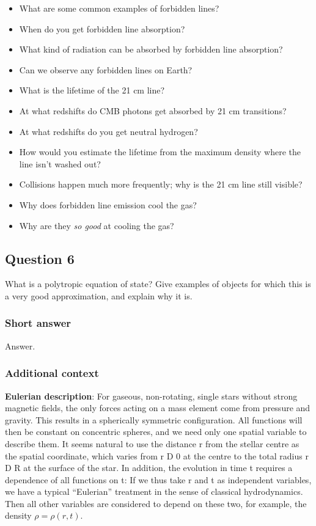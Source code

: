 \documentclass[a4paper,10pt]{article}
\begin{document}
\begin{itemize}
    \item What are some common examples of forbidden lines?
    \item When do you get forbidden line absorption?
    \item What kind of radiation can be absorbed by forbidden line absorption?
    \item Can we observe any forbidden lines on Earth?
    \item What is the lifetime of the 21 cm line?
    \item At what redshifts do CMB photons get absorbed by 21 cm transitions?
    \item At what redshifts do you get neutral hydrogen?
    \item How would you estimate the lifetime from the maximum density where the line isn't washed out?
    \item Collisions happen much more frequently; why is the 21 cm line still visible?
    \item Why does forbidden line emission cool the gas?
    \item Why are they \textit{so good} at cooling the gas?
\end{itemize}


\newpage
\subsection{Question 6}

What is a polytropic equation of state? Give examples of objects for which this is a very good approximation, and explain why it is.

\subsubsection{Short answer}

Answer.

\subsubsection{Additional context}

{\noindent}\textbf{Eulerian description}: For gaseous, non-rotating, single stars without strong magnetic fields, the only forces acting on a mass element come from pressure and gravity. This results in a spherically symmetric configuration. All functions will then be constant on concentric spheres, and we need only one spatial variable to describe them. It seems natural to use the distance r from the stellar centre as the spatial coordinate, which varies from r D 0 at the centre to the total radius r D R at the surface of the star. In addition, the evolution in time t requires a dependence of all functions on t: If we thus take r and t as independent variables, we have a typical ``Eulerian'' treatment in the sense of classical hydrodynamics. Then all other variables are considered to depend on these two, for example, the density $\rho=\rho(r,t)$.
\end{document}
